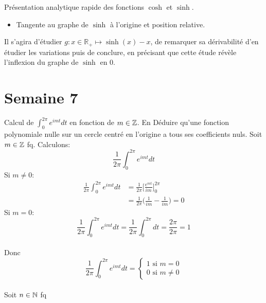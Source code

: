 \documentclass{article}
\renewenvironment{question_kholle}[2][ ]
{
	\subsection{\texorpdfstring{#2}{}}
	\notblank{#1}
	{
		\noindent #1
		\bigbreak
	}
	{}
	\begin{proof}
}
{
	\end{proof}
}
\begin{document}
\begin{question_kholle}{Présentation analytique rapide des fonctions \(\cosh\) et \(\sinh \).}
\begin{itemize}[label=$\bullet$]
		\
		
		\item Tangente au graphe de $\sinh$ à l'origine et position relative.
	\end{itemize}

	Il s'agira d'étudier $g : x\in \mathbb{R}_+ \mapsto \sinh(x) -x$, de remarquer sa dérivabilité d'en étudier les variations puis de conclure, en précisant que cette étude révèle l'inflexion du graphe de $\sinh$ en 0.
\end{question_kholle}

\pagebreak\section{Semaine 7}

\begin{question_kholle}{Calcul de $\int_0^{2\pi}e^{imt}dt$ en fonction de $m \in \mathbb Z$. En Déduire qu'une fonction polynomiale nulle sur un cercle centré en l'origine a tous ses coefficients nuls.}
	Soit $m \in \mathbb Z$ fq. Calculons:
	$$\frac{1}{2 \pi} \int_0^{2\pi}e^{imt}dt$$
	Si $m \neq 0$:
	\begin{align*}
		\frac{1}{2 \pi} \int_0^{2\pi}e^{imt}dt &= \frac{1}{2 \pi} \Big[ \frac{e^{mt}}{im} \Big]_0^{2\pi}\\
		&= \frac{1}{2 \pi} \Big( \frac{1}{im} - \frac{1}{im} \Big) = 0
	\end{align*}
	Si $m = 0$:
	$$
		\frac{1}{2 \pi} \int_0^{2\pi}e^{imt}dt = \frac{1}{2 \pi} \int_0^{2\pi}dt = \frac{2 \pi}{2 \pi} = 1
	$$
	\\
	Donc $$\frac{1}{2 \pi} \int_0^{2\pi}e^{imt}dt = 
	\begin{cases}
		1 \text{ si } m=0\\
		0 \text{ si } m \neq 0
	\end{cases}
	$$
	\\
	Soit $n\in \mathbb N$ fq
	

\end{question_kholle}
\end{document}
